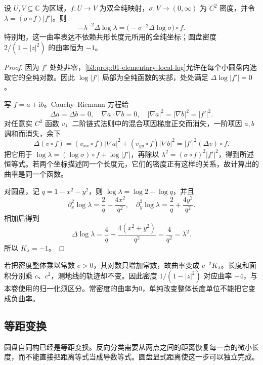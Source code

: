 \begin{proposition}[共形曲率的坐标不变性]\label{b3:prop:13-curvature-coordinate}
设 \(U,V\subseteq\mathbb C\) 为区域，\(f:U\to V\) 为双全纯映射，\(\sigma:V\to(0,\infty)\) 为 \(C^2\) 密度，并令 \(\lambda=(\sigma\circ f)|f'|\)。则
\[
 -\lambda^{-2}\Delta\log\lambda
 =\bigl(-\sigma^{-2}\Delta\log\sigma\bigr)\circ f.
\]
特别地，这一曲率表达不依赖共形长度元所用的全纯坐标；圆盘密度 \(2/(1-|z|^2)\) 的曲率恒为 \(-1\)。
\end{proposition}
\begin{proof}
因为 \(f'\) 处处非零，\cref{b3:prop:01-elementary-local-log}允许在每个小圆盘内选取它的全纯对数。因此 \(\log|f'|\) 局部为全纯函数的实部，处处满足 \(\Delta\log|f'|=0\)。

写 \(f=a+\mathrm ib\)。Cauchy--Riemann 方程给
\[
 \Delta a=\Delta b=0,\quad
 \nabla a\cdot\nabla b=0,\quad
 |\nabla a|^2=|\nabla b|^2=|f'|^2.
\]
对任意实 \(C^2\) 函数 \(v\)，二阶链式法则中的混合项因梯度正交而消失，一阶项因 \(a,b\) 调和而消失，余下
\[
 \Delta(v\circ f)
 =(v_{xx}\circ f)|\nabla a|^2
  +(v_{yy}\circ f)|\nabla b|^2
 =|f'|^2(\Delta v)\circ f.
\]
把它用于 \(\log\lambda=(\log\sigma)\circ f+\log|f'|\)，再除以
\(\lambda^2=(\sigma\circ f)^2|f'|^2\)，得到所述恒等式。若两个坐标描述同一个长度元，它们的密度正有这样的关系，故计算出的曲率是同一个函数。

对圆盘，记 \(q=1-x^2-y^2\)，则 \(\log\lambda=\log2-\log q\)，并且
\[
 \partial_x^2\log\lambda=\frac2q+\frac{4x^2}{q^2},
 \quad
 \partial_y^2\log\lambda=\frac2q+\frac{4y^2}{q^2}.
\]
相加后得到
\[
 \Delta\log\lambda
 =\frac4q+\frac{4(x^2+y^2)}{q^2}
 =\frac4{q^2}=\lambda^2.
\]
所以 \(K_\lambda=-1\)。
\end{proof}

若把密度整体乘以常数 \(c>0\)，其对数只增加常数，故曲率变成 \(c^{-2}K_\lambda\)。长度和面积分别乘 \(c\)、\(c^2\)，测地线的轨迹却不变。因此密度 \(1/(1-|z|^2)\) 对应曲率 \(-4\)，与本卷使用的归一化须区分。常密度的曲率为0，单纯改变整体长度单位不能把它变成负曲率。

\subsection{等距变换}
\label{b3:subsec:130204}

圆盘自同构已经是等距变换。反向分类需要从两点之间的距离恢复每一点的微小长度，而不能直接把距离等式当成导数等式。圆盘显式距离使这一步可以独立完成。

